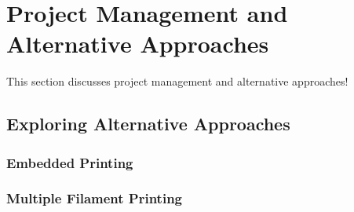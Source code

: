 \section{Project Management and Alternative Approaches\label{methedology:pivoting}}
This section discusses project management and alternative approaches!



\subsection{Exploring Alternative Approaches\label{sec:methedology:pivoting:alternativeApproaches}}

\subsubsection{Embedded Printing\label{sec:methedology:pivoting:alternativeApproaches:embeddedPrinting}}

\subsubsection{Multiple Filament Printing\label{sec:methedology:pivoting:alternativeApproaches:multipleFilamentPrinting}}

